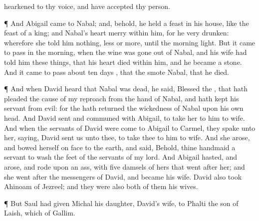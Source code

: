 {hearkened to thy
voice, and have
accepted thy
person.
\par }{\PP {}¶ And
Abigail
came to
Nabal; and, behold, he held a
feast in his
house, like the
feast of a
king; and
Nabal’s
heart
{}
merry within him, for he
{}
very
drunken: wherefore she
told him
nothing,
less or
more, until the
morning
light.
But it came to pass in the
morning, when the
wine was gone
out of
Nabal, and his
wife had
told him these
things, that his
heart
died
within him, and he became
{} a
stone.
And it came to pass about
ten
days
{}, that the
{}
smote
Nabal, that he
died.
\par }{\PP {}¶ And when
David
heard that
Nabal was
dead, he
said,
Blessed
{} the
{}, that hath
pleaded the
cause of my
reproach from the
hand of
Nabal, and hath
kept his
servant from
evil: for the
{} hath
returned the
wickedness of
Nabal upon his own
head. And
David
sent and
communed with
Abigail, to
take her to him to
wife.
And when the
servants of
David were
come to
Abigail to
Carmel, they
spake unto her,
saying,
David
sent us unto thee, to
take thee to him to
wife.
And she
arose, and
bowed herself on
{}
face to the
earth, and
said, Behold,
{} thine
handmaid
{} a
servant to
wash the
feet of the
servants of my
lord.
And
Abigail
hasted, and
arose, and
rode upon an
ass, with
five
damsels of hers that
went
after her; and she
went
after the
messengers of
David, and became his
wife.
David also
took
Ahinoam of
Jezreel; and they were also
both of them his
wives.
\par }{\PP {}¶ But
Saul had
given
Michal his
daughter,
David’s
wife, to
Phalti the
son of
Laish, which
{} of
Gallim.

}

